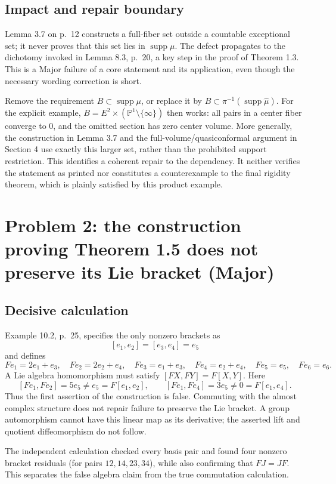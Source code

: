 \documentclass[10pt]{article}
\begin{document}
\subsection*{Impact and repair boundary}
Lemma 3.7 on p. 12 constructs a full-fiber set outside a countable exceptional set; it never proves that this set lies in \(\operatorname{supp}\mu\). The defect propagates to the dichotomy invoked in Lemma 8.3, p. 20, a key step in the proof of Theorem 1.3. This is a Major failure of a core statement and its application, even though the necessary wording correction is short.\par
Remove the requirement \(B\subset\operatorname{supp}\mu\), or replace it by \(B\subset\pi^{-1}(\operatorname{supp}\widehat\mu)\). For the explicit example, \(B=E^2\times(\mathbb P^1\setminus\{\infty\})\) then works: all pairs in a center fiber converge to \(0\), and the omitted section has zero center volume. More generally, the construction in Lemma 3.7 and the full-volume/quasiconformal argument in Section 4 use exactly this larger set, rather than the prohibited support restriction. This identifies a coherent repair to the dependency. It neither verifies the statement as printed nor constitutes a counterexample to the final rigidity theorem, which is plainly satisfied by this product example.\par
\section*{Problem 2: the construction proving Theorem 1.5 does not preserve its Lie bracket (Major)}
\subsection*{Decisive calculation}
Example 10.2, p. 25, specifies the only nonzero brackets as \[[e_1,e_2]=[e_3,e_4]=e_5\] and defines \[Fe_1=2e_1+e_3,\quad Fe_2=2e_2+e_4,\quad
 Fe_3=e_1+e_3,\quad Fe_4=e_2+e_4,\quad
 Fe_5=e_5,\quad Fe_6=e_6.\] A Lie algebra homomorphism must satisfy \([FX,FY]=F[X,Y]\). Here \[[Fe_1,Fe_2]=5e_5\ne e_5=F[e_1,e_2],
 \qquad
 [Fe_1,Fe_4]=3e_5\ne0=F[e_1,e_4].\] Thus the first assertion of the construction is false. Commuting with the almost complex structure does not repair failure to preserve the Lie bracket. A group automorphism cannot have this linear map as its derivative; the asserted lift and quotient diffeomorphism do not follow.\par
The independent calculation checked every basis pair and found four nonzero bracket residuals (for pairs \(12,14,23,34\)), while also confirming that \(FJ=JF\). This separates the false algebra claim from the true commutation calculation.\par
\end{document}
